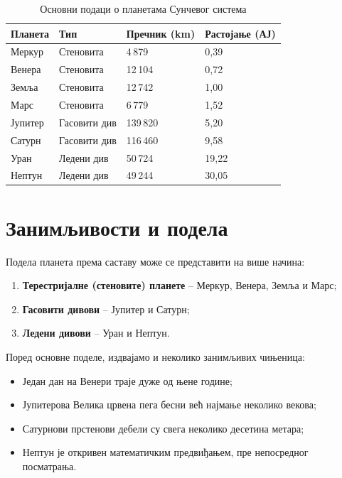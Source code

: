 \documentclass[12pt,a4paper]{article}
\begin{document}
\begin{table}[h]
\centering
\caption{Основни подаци о планетама Сунчевог система}
\label{tab:planete}
\begin{tabular}{lp{2.6cm}p{2.6cm}p{2.6cm}}
\toprule
\textbf{Планета} & \textbf{Тип} & \textbf{Пречник (km)} & \textbf{Растојање (АЈ)} \\
\midrule
Меркур  & Стеновита     & 4\,879   & 0,39 \\
Венера  & Стеновита     & 12\,104  & 0,72 \\
Земља   & Стеновита     & 12\,742  & 1,00 \\
Марс    & Стеновита     & 6\,779   & 1,52 \\
Јупитер & Гасовити див  & 139\,820 & 5,20 \\
Сатурн  & Гасовити див  & 116\,460 & 9,58 \\
Уран    & Ледени див    & 50\,724  & 19,22 \\
Нептун  & Ледени див    & 49\,244  & 30,05 \\
\bottomrule
\end{tabular}
\end{table}

\section{Занимљивости и подела}

Подела планета према саставу може се представити на више начина:

\begin{enumerate}[label=\arabic*)]
  \item \textbf{Терестријалне (стеновите) планете} -- Меркур, Венера, Земља и Марс;
  \item \textbf{Гасовити дивови} -- Јупитер и Сатурн;
  \item \textbf{Ледени дивови} -- Уран и Нептун.
\end{enumerate}

Поред основне поделе, издвајамо и неколико занимљивих чињеница:

\begin{itemize}[label=--]
  \item Један дан на Венери траје дуже од њене године;
  \item Јупитерова Велика црвена пега бесни већ најмање неколико векова;
  \item Сатурнови прстенови дебели су свега неколико десетина метара;
  \item Нептун је откривен математичким предвиђањем, пре непосредног посматрања.
\end{itemize}
\end{document}
